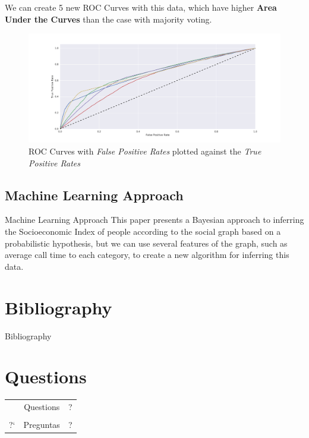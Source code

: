 \documentclass{beamer}
\begin{document}
\begin{frame}
	We can create 5 new ROC Curves with this data, which have higher \textbf{Area Under the Curves} than the case with majority voting.

	\begin{figure}
		\includegraphics[height=.6\textheight]{../figures/ROC_multiclass_wide.png}
		\caption{ROC Curves with \textit{False Positive Rates} plotted against the \textit{True Positive Rates}}
	\end{figure}
\end{frame}

\subsection{Machine Learning Approach}
\begin{frame}{Machine Learning Approach}
	This paper presents a Bayesian approach to inferring the Socioeconomic Index of people according to the social graph based on a probabilistic hypothesis, but we can use several features of the graph, such as average call time to each category, to create a new algorithm for inferring this data.
\end{frame}

\section{Bibliography}

\begin{frame}{Bibliography}

\renewcommand*{\bibfont}{\footnotesize}
\printbibliography{}

\end{frame}

\section{Questions}

\begin{frame}
	\Huge
	\begin{center}
	\begin{tabular}{@{}r@{}c@{}l@{}}
		&Questions&?\scalebox{.8}{?\scalebox{.8}{?\scalebox{.8}{?\scalebox{.8}{?\scalebox{.8}{?\scalebox{.8}{?}}}}}} \\
		&&\\
		\scalebox{.8}{\scalebox{.8}{\scalebox{.8}{\scalebox{.8}{\scalebox{.8}{\scalebox{.8}{?`}?`}?`}?`}?`}?`}?`&Preguntas&?\scalebox{.8}{?\scalebox{.8}{?\scalebox{.8}{?\scalebox{.8}{?\scalebox{.8}{?\scalebox{.8}{?}}}}}}
	\end{tabular}
	\end{center}
\end{frame}
\end{document}
